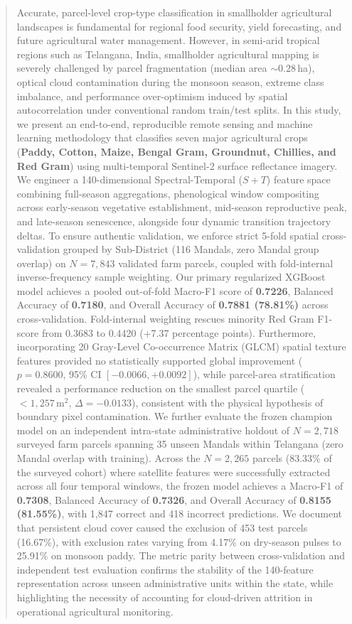 \documentclass[runningheads]{llncs}
\begin{document}
\begin{abstract}
Accurate, parcel-level crop-type classification in smallholder agricultural landscapes is fundamental for regional food security, yield forecasting, and future agricultural water management. However, in semi-arid tropical regions such as Telangana, India, smallholder agricultural mapping is severely challenged by parcel fragmentation (median area $\sim 0.28$\,ha), optical cloud contamination during the monsoon season, extreme class imbalance, and performance over-optimism induced by spatial autocorrelation under conventional random train/test splits. In this study, we present an end-to-end, reproducible remote sensing and machine learning methodology that classifies seven major agricultural crops (\textbf{Paddy, Cotton, Maize, Bengal Gram, Groundnut, Chillies, and Red Gram}) using multi-temporal Sentinel-2 surface reflectance imagery. We engineer a 140-dimensional Spectral-Temporal ($S+T$) feature space combining full-season aggregations, phenological window compositing across early-season vegetative establishment, mid-season reproductive peak, and late-season senescence, alongside four dynamic transition trajectory deltas. To ensure authentic validation, we enforce strict 5-fold spatial cross-validation grouped by Sub-District (116 Mandals, zero Mandal group overlap) on $N = 7{,}843$ validated farm parcels, coupled with fold-internal inverse-frequency sample weighting. Our primary regularized XGBoost model achieves a pooled out-of-fold Macro-F1 score of \textbf{0.7226}, Balanced Accuracy of \textbf{0.7180}, and Overall Accuracy of \textbf{0.7881 (78.81\%)} across cross-validation. Fold-internal weighting rescues minority Red Gram F1-score from 0.3683 to 0.4420 (+7.37 percentage points). Furthermore, incorporating 20 Gray-Level Co-occurrence Matrix (GLCM) spatial texture features provided no statistically supported global improvement ($p = 0.8600$, 95\% CI $[-0.0066, +0.0092]$), while parcel-area stratification revealed a performance reduction on the smallest parcel quartile ($<1{,}257\,\text{m}^2$, $\Delta = -0.0133$), consistent with the physical hypothesis of boundary pixel contamination. We further evaluate the frozen champion model on an independent intra-state administrative holdout of $N = 2{,}718$ surveyed farm parcels spanning 35 unseen Mandals within Telangana (zero Mandal overlap with training). Across the $N = 2{,}265$ parcels (83.33\% of the surveyed cohort) where satellite features were successfully extracted across all four temporal windows, the frozen model achieves a Macro-F1 of \textbf{0.7308}, Balanced Accuracy of \textbf{0.7326}, and Overall Accuracy of \textbf{0.8155 (81.55\%)}, with 1,847 correct and 418 incorrect predictions. We document that persistent cloud cover caused the exclusion of 453 test parcels (16.67\%), with exclusion rates varying from 4.17\% on dry-season pulses to 25.91\% on monsoon paddy. The metric parity between cross-validation and independent test evaluation confirms the stability of the 140-feature representation across unseen administrative units within the state, while highlighting the necessity of accounting for cloud-driven attrition in operational agricultural monitoring.


\end{abstract}
\end{document}
